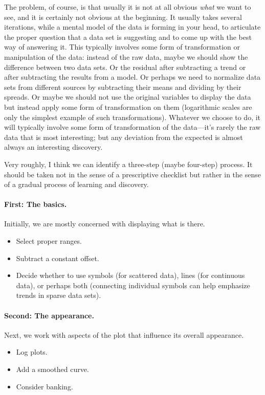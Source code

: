 The problem, of course, is that usually it is not at all obvious
\emph{what} we want to see, and it is certainly not obvious at the
beginning. It usually takes several iterations, while a mental model
of the data is forming in your head, to articulate the proper question
that a data set is suggesting and to come up with the best way of
answering it.  This typically involves some form of transformation or
manipulation of the data: instead of the raw data, maybe we should
show the difference between two data sets. Or the residual after
subtracting a trend or after subtracting the results from a model. Or
perhaps we need to normalize data sets from different sources by
subtracting their means and dividing by their spreads. Or maybe we
should not use the original variables to display the data but instead
apply some form of transformation on them (logarithmic scales are only
the simplest example of such transformations). Whatever we choose to
do, it will typically involve some form of transformation of the
data---it's rarely the raw data that is most interesting; but any
deviation from the expected is almost always an interesting discovery.

Very roughly, I think we can identify a three-step (maybe four-step)  
process. It should be taken not in the sense of a prescriptive
checklist but rather in the sense of a gradual process of learning and
discovery.

\paragraph{First: The basics.} Initially, we are mostly concerned with
displaying what is there.
\begin{itemize}
\item Select proper ranges.
\item Subtract a constant offset.
\item Decide whether to use symbols (for scattered data), lines (for
  continuous data), or perhaps both (connecting individual symbols
  can help emphasize trends in sparse data sets).
\end{itemize}

\paragraph{Second: The appearance.} Next, we work with aspects of the
plot that influence its overall appearance.
\begin{itemize}
\item Log plots.
\item Add a smoothed curve.
\item Consider banking.
\end{itemize}

